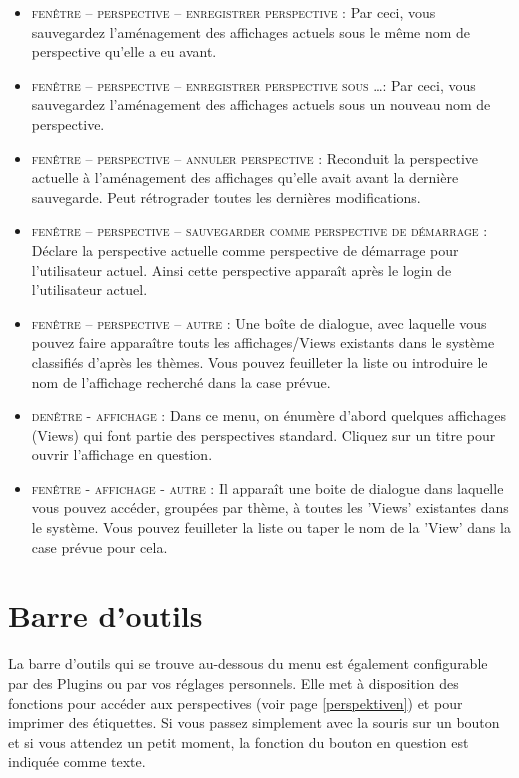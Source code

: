 \begin{itemize}
  \item {\textsc{fenêtre -- perspective -- enregistrer perspective }: Par ceci, vous sauvegardez l'aménagement des affichages actuels sous le même nom de perspective qu'elle a eu avant.}
  \item {\textsc{fenêtre -- perspective -- enregistrer perspective sous \ldots}:
  Par ceci, vous sauvegardez l'aménagement des affichages actuels sous un nouveau nom de perspective.}
  \item {\textsc{fenêtre -- perspective -- annuler perspective }: Reconduit la perspective actuelle à l'aménagement des affichages qu'elle avait avant la dernière sauvegarde. Peut rétrograder toutes les dernières modifications.}
  \item {\textsc{fenêtre -- perspective -- sauvegarder comme perspective de démarrage }: Déclare la perspective actuelle comme perspective de démarrage pour l'utilisateur actuel. Ainsi cette perspective apparaît après le login de l'utilisateur actuel.}
  \item {\textsc{fenêtre -- perspective -- autre }: Une boîte de dialogue, avec laquelle vous pouvez faire apparaître touts les affichages/Views existants dans le système classifiés d'après les thèmes. Vous pouvez feuilleter la liste ou introduire le nom de l'affichage recherché dans la case prévue.}
  \item {\textsc{denêtre - affichage }: Dans ce menu, on énumère d'abord quelques affichages (Views) qui font partie des perspectives standard. Cliquez sur un titre pour ouvrir l'affichage en question.}
  \item {\textsc{fenêtre - affichage - autre }: Il apparaît une boite de dialogue dans laquelle vous pouvez accéder, groupées par thème, à toutes les 'Views' existantes dans le système. Vous pouvez feuilleter la liste ou taper le nom de la 'View' dans la case prévue pour cela.}
\end{itemize}

\section{Barre d'outils}
La barre d'outils qui se trouve au-dessous du menu est également configurable par des Plugins ou par vos réglages personnels. Elle met à disposition des fonctions pour accéder aux perspectives (voir page \ref{perspektiven})
et pour imprimer des étiquettes. Si vous passez simplement avec la souris sur un bouton et si vous attendez un petit moment, la fonction du bouton en question est indiquée comme texte. 